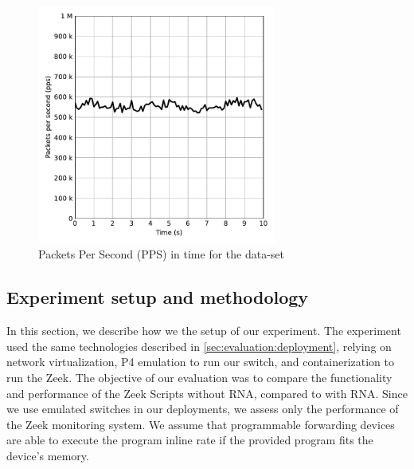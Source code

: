 \begin{figure}[htb]
    \caption{Packets Per Second (PPS) in time for the data-set}
    \begin{center}
        \includegraphics[width=0.7\textwidth]{images/pps_in_time.pdf}  
    \end{center}
    \label{fig:pps_in_time}
\end{figure}




\subsection{Experiment setup and methodology}
\label{sec:evaluation:setup}

In this section, we describe how we the setup of our experiment. The experiment used the same technologies described in \autoref{sec:evaluation:deployment}, relying on network virtualization, P4 emulation to run our switch, and containerization to run the Zeek. The objective of our evaluation was to compare the functionality and performance of the Zeek Scripts without RNA, compared to with RNA. Since we use emulated switches in our deployments, we assess only the performance of the Zeek monitoring system. We assume that programmable forwarding devices are able to execute the program inline rate if the provided program fits the device's memory.

